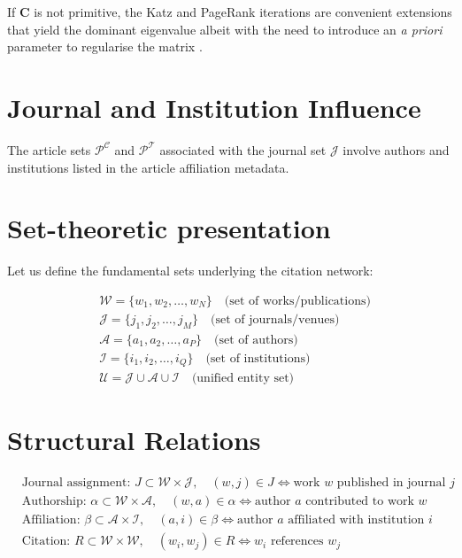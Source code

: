 \documentclass[12pt]{article}
\begin{document}
If $\mathbf{C}$ is not primitive, the Katz and PageRank iterations are convenient extensions that yield the dominant eigenvalue albeit with the need to introduce an  \textit{a priori} parameter to regularise the matrix \citep{vignaSpectralRanking2016, franceschetPageRankStandingShoulders2011}.

\section{Journal and Institution Influence}

The article sets $\mathcal{P^C}$ and $\mathcal{P^T}$ associated with the journal set  $\mathcal{J}$ involve authors and institutions listed in the article affiliation metadata.


\section{Set-theoretic presentation}


Let us define the fundamental sets underlying the citation network:

\begin{align*}
	&\mathcal{W} = \{w_1, w_2, \dots, w_N\} \quad \text{(set of works/publications)} \\
	&\mathcal{J} = \{j_1, j_2, \dots, j_M\} \quad \text{(set of journals/venues)} \\
	&\mathcal{A} = \{a_1, a_2, \dots, a_P\} \quad \text{(set of authors)} \\
	&\mathcal{I} = \{i_1, i_2, \dots, i_Q\} \quad \text{(set of institutions)} \\
	&\mathcal{U} = \mathcal{J} \cup \mathcal{A} \cup \mathcal{I} \quad \text{(unified entity set)}
\end{align*}

\section{Structural Relations}

\begin{align*}
	&\text{Journal assignment: } J \subset \mathcal{W} \times \mathcal{J}, \quad (w, j) \in J \iff \text{work $w$ published in journal $j$} \\
	&\text{Authorship: } \alpha \subset \mathcal{W} \times \mathcal{A}, \quad (w, a) \in \alpha \iff \text{author $a$ contributed to work $w$} \\
	&\text{Affiliation: } \beta \subset \mathcal{A} \times \mathcal{I}, \quad (a, i) \in \beta \iff \text{author $a$ affiliated with institution $i$} \\
	&\text{Citation: } R \subset \mathcal{W} \times \mathcal{W}, \quad (w_i, w_j) \in R \iff w_i \text{ references } w_j
\end{align*}
\end{document}
